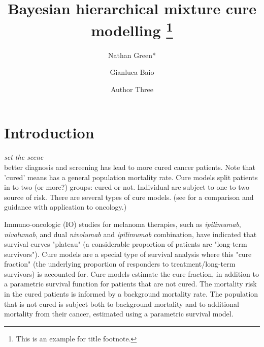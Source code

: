 \documentclass[AMA,STIX1COL]{WileyNJD-v2}
\begin{document}
\title{Bayesian hierarchical mixture cure modelling \protect\thanks{This is an example for title footnote.}}

\author[1]{Nathan Green*}

\author[2,3]{Gianluca Baio}

\author[3]{Author Three}


\address[1]{, , }

\address[2]{, , }

\address[3]{, , }


\presentaddress{}




\maketitle



\section{Introduction}\label{sec:intro}

{\it set the scene}\\
better diagnosis and screening has lead to more cured cancer patients.
Note that 'cured' means has a general population mortality rate.
Cure models split patients in to two (or more?) groups: cured or not.
Individual are subject to one to two source of risk.
There are several types of cure models.
(see \cite{Yu2013} for a comparison and guidance with application to oncology.)


Immuno-oncologic (IO) studies for melanoma therapies, such as {\it ipilimumab}, {\it nivolumab}, and dual {\it nivolumab} and {\it ipilimumab} combination,
have indicated that survival curves "plateau" (a considerable proportion of patients are "long-term survivors").
Cure models are a special type of survival analysis where this "cure fraction" (the underlying proportion of responders to treatment/long-term survivors) is accounted for.
Cure models estimate the cure fraction, in addition to a parametric survival function for patients that are not cured.
The mortality risk in the cured patients is informed by a background mortality rate.
The population that is not cured is subject both to background mortality and to additional mortality from their cancer, estimated using a parametric survival model.
\cite{Amico2018}
\end{document}
